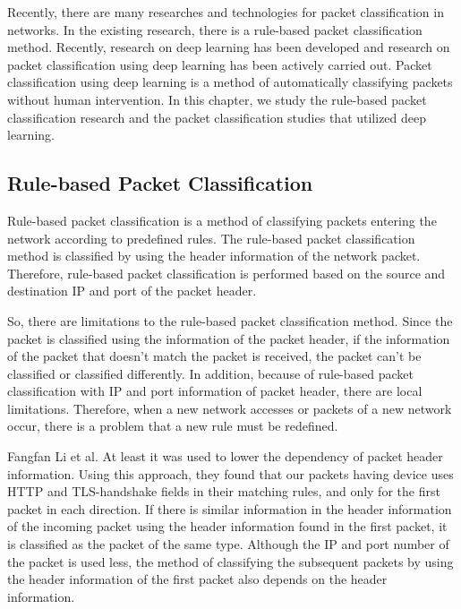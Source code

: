 Recently, there are many researches and technologies for packet classification in networks.
In the existing research, there is a rule-based packet classification method.
Recently, research on deep learning has been developed and research on packet classification using deep learning has been actively carried out.
Packet classification using deep learning is a method of automatically classifying packets without human intervention.
In this chapter, we study the rule-based packet classification research and the packet classification studies that utilized deep learning.

\subsection{Rule-based Packet Classification}\label{subsec:rule-basedPacketClassification}
Rule-based packet classification \cite{Li:2016:CUE:2987443.2987464,T4738466,UDREA2008130} is a method of classifying packets entering the network according to predefined rules.
The rule-based packet classification method is classified by using the header information of the network packet.
Therefore, rule-based packet classification is performed based on the source and destination IP and port of the packet header.

So, there are limitations to the rule-based packet classification method.
Since the packet is classified using the information of the packet header, if the information of the packet that doesn't match the packet is received, the packet can't be classified or classified differently.
In addition, because of rule-based packet classification with IP and port information of packet header, there are local limitations.
Therefore, when a new network accesses or packets of a new network occur, there is a problem that a new rule must be redefined.

Fangfan Li et al. \cite{Li:2016:CUE:2987443.2987464} At least it was used to lower the dependency of packet header information.
Using this approach, they found that our packets having device uses HTTP and TLS-handshake fields in their matching rules, and only for the first packet in each direction.
If there is similar information in the header information of the incoming packet using the header information found in the first packet, it is classified as the packet of the same type.
Although the IP and port number of the packet is used less, the method of classifying the subsequent packets by using the header information of the first packet also depends on the header information.

